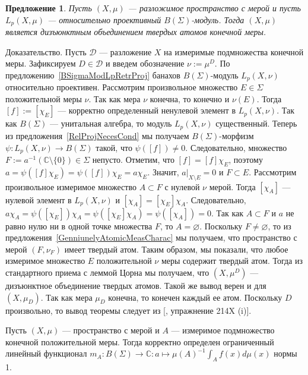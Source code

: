 \documentclass[12pt]{article}
\numberwithin{equation}{subsection}
\theoremstyle{plain}
\newtheorem{proposition}{Предложение}
\newenvironment{proof}{Доказательство.}{}
\begin{document}
\begin{fulltext}
    \begin{proposition}\label{LpBSigmaModNecessCond} Пусть $(X,\mu)$ ---
        разложимое пространство с мерой и пусть $L_p(X,\mu)$ --- относительно
        проективный $B(\Sigma)$-модуль. Тогда $(X,\mu)$ является дизъюнктным
        объединением твердых атомов конечной меры.
    \end{proposition}
    \begin{proof} Пусть $\mathcal{D}$ --- разложение $X$ на измеримые
        подмножества конечной меры. Зафиксируем $D\in\mathcal{D}$ и введем
        обозначение $\nu:=\mu^D$. По предложению~\ref{BSigmaModLpRetrProj}
        банахов $B(\Sigma)$-модуль $L_p(X,\nu)$ относительно проективен.
        Рассмотрим произвольное множество $E\in\Sigma$ положительной меры $\nu$.
        Так как мера $\nu$ конечна, то конечно и $\nu(E)$. Тогда $[f]:=[\chi_E]$
        --- корректно определенный ненулевой элемент в $L_p(X,\nu)$. Так как
        $B(\Sigma)$ --- унитальная алгебра, то модуль $L_p(X,\nu)$ существенный.
        Теперь из предложения~\ref{RelProjNecesCond} мы получаем
        $B(\Sigma)$-морфизм $\psi:L_p(X,\nu)\to B(\Sigma)$ такой, что
        $\psi([f])\neq 0$. Следовательно, множество
        $F:=a^{-1}(\mathbb{C}\setminus \{0\})\in\Sigma$ непусто. Отметим, что
        $[f]=[f]\chi_E$, поэтому $a=\psi([f]\chi_E)=\psi([f])\chi_E=a\chi_E$.
        Значит, $a|_{X\setminus E}=0$ и $F\subset E$. Рассмотрим произвольное
        измеримое множество $A\subset F$ с нулевой $\nu$ мерой. Тогда $[\chi_A]$
        --- нулевой элемент в  $L_p(X,\nu)$ и $[\chi_A]=[\chi_E]\chi_A$.
        Следовательно,
        $a\chi_A=\psi([\chi_E])\chi_A=\psi([\chi_E]\chi_A)=\psi([\chi_A])=0$.
        Так как $A\subset F$ и $a$ не равно нулю ни в одной точке множества $F$,
        то $A=\varnothing$. Поскольку $F\neq \varnothing$, то из
        предложения~\ref{GenniunelyAtomicMeasCharac} мы получаем, что
        пространство с мерой $(F,\nu_F)$ имеет твердый атом. Таким образом, мы
        показали, что любое измеримое множество $E$ положительной $\nu$ меры
        содержит твердый атом. Тогда из стандартного приема с леммой Цорна мы
        получаем, что $(X,\mu^D)$ --- дизъюнктное объединение твердых атомов.
        Такой же вывод верен и для $(X,\mu_D)$. Так как мера $\mu_D$ конечна, то
        конечен каждый ее атом. Поскольку $D$ произвольно, то вывод теоремы
        следует из [\cite{FremMeasTh2}, упражнение 214X (i)].
    \end{proof}

    Пусть $(X,\mu)$ --- пространство с мерой и $A$ --- измеримое подмножество
    конечной положительной меры. Тогда корректно определен ограниченный линейный
    функционал $m_A:B(\Sigma)\to\mathbb{C}:a\mapsto {\mu(A)}^{-1}\int_A
        f(x)d\mu(x)$ нормы 1.


\end{fulltext}
\end{document}
